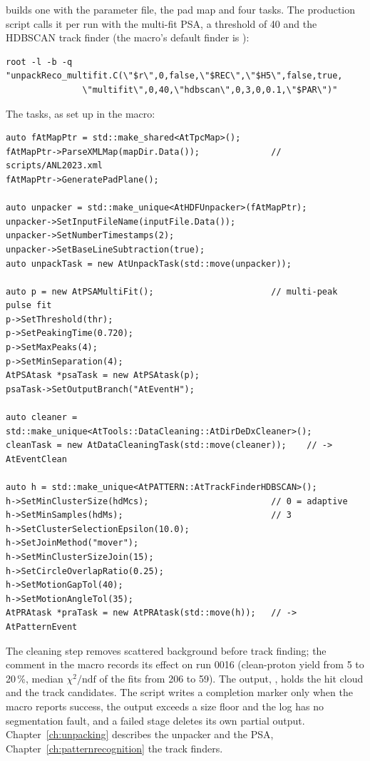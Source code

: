  builds one  with the parameter file, the pad map and four
tasks. The production script  calls it per run with the multi-fit PSA, a threshold of 40 and
the HDBSCAN track finder (the macro's default finder is ):
\begin{verbatim}
root -l -b -q "unpackReco_multifit.C(\"$r\",0,false,\"$REC\",\"$H5\",false,true,
               \"multifit\",0,40,\"hdbscan\",0,3,0,0.1,\"$PAR\")"
\end{verbatim}
The tasks, as set up in the macro:
\begin{verbatim}
auto fAtMapPtr = std::make_shared<AtTpcMap>();
fAtMapPtr->ParseXMLMap(mapDir.Data());              // scripts/ANL2023.xml
fAtMapPtr->GeneratePadPlane();

auto unpacker = std::make_unique<AtHDFUnpacker>(fAtMapPtr);
unpacker->SetInputFileName(inputFile.Data());
unpacker->SetNumberTimestamps(2);
unpacker->SetBaseLineSubtraction(true);
auto unpackTask = new AtUnpackTask(std::move(unpacker));

auto p = new AtPSAMultiFit();                       // multi-peak pulse fit
p->SetThreshold(thr);
p->SetPeakingTime(0.720);
p->SetMaxPeaks(4);
p->SetMinSeparation(4);
AtPSAtask *psaTask = new AtPSAtask(p);
psaTask->SetOutputBranch("AtEventH");

auto cleaner = std::make_unique<AtTools::DataCleaning::AtDirDeDxCleaner>();
cleanTask = new AtDataCleaningTask(std::move(cleaner));    // -> AtEventClean

auto h = std::make_unique<AtPATTERN::AtTrackFinderHDBSCAN>();
h->SetMinClusterSize(hdMcs);                        // 0 = adaptive
h->SetMinSamples(hdMs);                             // 3
h->SetClusterSelectionEpsilon(10.0);
h->SetJoinMethod("mover");
h->SetMinClusterSizeJoin(15);
h->SetCircleOverlapRatio(0.25);
h->SetMotionGapTol(40);
h->SetMotionAngleTol(35);
AtPRAtask *praTask = new AtPRAtask(std::move(h));   // -> AtPatternEvent
\end{verbatim}
The cleaning step removes scattered background before track finding; the comment in the macro records its effect on
run 0016 (clean-proton yield from 5 to 20\,\%, median $\chi^2/\mathrm{ndf}$ of the fits from 206 to 59). The output,
, holds the hit cloud and the track candidates. The script writes a completion
marker only when the macro reports success, the output exceeds a size floor and the log has no segmentation fault,
and a failed stage deletes its own partial output. Chapter~\ref{ch:unpacking} describes the unpacker and the PSA,
Chapter~\ref{ch:patternrecognition} the track finders.

